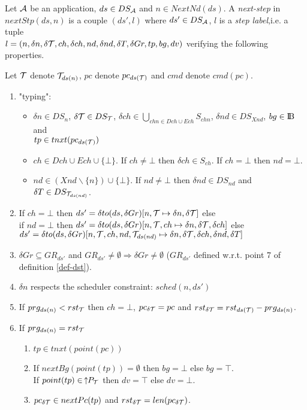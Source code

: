 \documentclass{article}
\newcommand{\BOOL}{\mbox{\normalfont I$\!$B}}
\begin{document}
\begin{definition}\label{def-step} Let ${\cal A}$ be an application, $ds\in DS_{\cal A}$ and $n\in NextN\!d(ds)$. A {\em next-step} in $nextStp(ds,n)$ is a couple $(ds',l)$ where $ds'\in DS_{\cal A}$, $l$ is a {\em step label},i.e. a tuple\\ $l= (n,\delta n,\delta {\cal T},ch,\delta ch,nd,\delta nd,\delta T,\delta Gr, tp,bg,dv)$ verifying the following properties.

\vspace{0.5mm}
Let ${\cal T}$ denote ${\cal T}_{ds(n)}$, $pc$ denote $pc_{ds({\cal T})}$ and $cmd$ denote $cmd(pc)$. 
\begin{enumerate}
\item "typing":
  \begin{itemize}
   \item $\delta n\in DS_{n}$, $\delta {\cal T}\in DS_{\cal T}$, $\delta ch\in\bigcup_{chn\in Dch\cup Ech} S_{chn}$, $\delta nd\in DS_{X\!nd}$,
	       $bg\in\BOOL$ and\\ $tp\in tnxt(pc_{ds({\cal T})})$
   \item $ch\in Dch\cup Ech\cup\{\bot\}$. If $ch\neq\bot$ then $\delta ch\in S_{ch}$. If $ch=\bot$ then $nd=\bot$.
   \item $nd\in (X\!nd\backslash\{n\})\cup\{\bot\}$. If $nd\neq\bot$ then $\delta nd\in DS_{nd}$ and $\delta T\in DS_{{\cal T}_{ds(nd)}}$.
	\end{itemize}
\item If $ch=\bot$ then $ds'=\delta to(ds,\delta Gr)[n,{\cal T}\mapsto\delta  n,\delta {\cal T}]$ else\\
      if $nd=\bot$ then $ds'=\delta to(ds,\delta Gr)[n,{\cal T},ch\mapsto\delta  n,\delta {\cal T},\delta ch]$ else\\ $ds'=\delta to(ds,\delta Gr)[n,{\cal T},ch,nd,{\cal T}_{ds(nd)}\mapsto\delta  n,\delta {\cal T},\delta ch,\delta nd,\delta T]$
\item $\delta Gr\subseteq GR_{ds'}$ and $GR_{ds'}\neq\emptyset\Rightarrow \delta Gr\neq\emptyset$ ($GR_{ds'}$ defined w.r.t. point 7 of definition \ref{def-dst}).

\item $\delta n$ respects the scheduler constraint: $sched(n,ds')$
		
\item If $prg_{ds(n)}< rst_{\cal T}$ then $ch=\bot$, $pc_{\delta{\cal T}}=pc$ and $rst_{\delta{\cal T}}=rst_{ds({\cal T})}-prg_{ds(n)}$.

\item If $prg_{ds(n)}= rst_{\cal T}$
      \begin{enumerate}
			\item $tp\in tnxt(point(pc))$
			\item If $nextBg(point(tp))=\emptyset$ then $bg=\bot$ else $bg=\top$.\\
			      If $point(tp)\in\,\uparrow\!\!P_{\cal T}$ then $dv=\top$ else $dv=\bot$.
      \item $pc_{\delta{\cal T}}\in nextPc(tp)$ and $rst_{\delta{\cal T}}=len(pc_{\delta{\cal T}})$.
			\end{enumerate}
			

\end{enumerate}
\end{definition}
\end{document}
